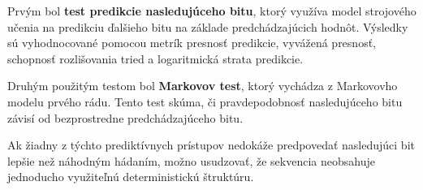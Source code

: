 Prvým bol \textbf{test predikcie nasledujúceho bitu}, ktorý využíva model strojového učenia na predikciu ďalšieho bitu na základe predchádzajúcich hodnôt.
Výsledky sú vyhodnocované pomocou metrík presnosť predikcie, vyvážená presnosť, schopnosť rozlišovania tried a logaritmická strata predikcie.

Druhým použitým testom bol \textbf{Markovov test}, ktorý vychádza z Markovovho modelu prvého rádu.
Tento test skúma, či pravdepodobnosť nasledujúceho bitu závisí od bezprostredne predchádzajúceho bitu.

Ak žiadny z týchto prediktívnych prístupov nedokáže predpovedať nasledujúci bit lepšie než náhodným hádaním, možno usudzovať, že sekvencia neobsahuje jednoducho využiteľnú deterministickú štruktúru.
